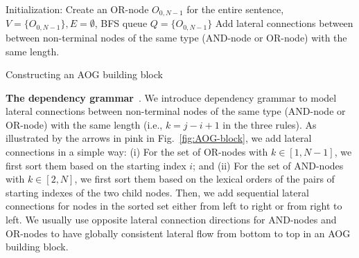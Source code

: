 \documentclass[10pt,twocolumn,letterpaper]{article}
\begin{document}
\begin{algorithm} %
\SetAlgoLined
{}
Initialization: Create an OR-node $O_{0,N-1}$ for the entire sentence, $V=\{O_{0,N-1}\}, E=\emptyset$, BFS queue $Q=\{O_{0,N-1}\}$\;
Add lateral connections between between non-terminal nodes of the same type (AND-node or OR-node) with the same length.  
\caption{Constructing an AOG building block}\label{alg:AOG} 
\end{algorithm}

\textbf{The dependency grammar}~\cite{DependencyGrammar,RCN,Zhu_Grammar}. We introduce dependency grammar to model lateral connections between non-terminal nodes of the same type (AND-node or OR-node) with the same length (i.e., $k=j-i+1$ in the three rules). As illustrated by the arrows in pink in Fig.~\ref{fig:AOG-block}, we add lateral connections in a simple way: (i) For the set of OR-nodes with $k\in [1, N-1]$, we first sort them based on the starting index $i$; and (ii) For the set of AND-nodes with $k\in [2, N]$, we first sort them based on the lexical orders of the pairs of starting indexes of the two child nodes. Then, we add sequential lateral connections for nodes in the sorted set either from left to right or from right to left. We usually use opposite lateral connection directions for AND-nodes and OR-nodes to have globally consistent lateral flow from bottom to top in an AOG building block.  
\end{document}
